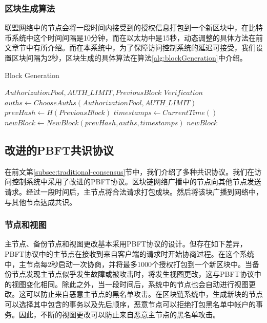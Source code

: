 \subsubsection{区块生成算法}

联盟网络中的节点会将一段时间内接受到的授权信息打包到一个新区块中，在比特币系统中这个时间间隔是10分钟，而在以太坊中是15秒，动态调整的具体方法在前文章节中有所介绍。而在本系统中，为了保障访问控制系统的延迟可接受，我们设置区块间隔为2秒，区块生成的具体算法在算法\ref{alg:blockGeneration}中介绍。

 \begin{algorithm}
 \caption{Block Generation}\label{alg:blockGeneration}
   \begin{algorithmic}[!htbp]
   \renewcommand{\algorithmicrequire}{\textbf{Input:}}
   \renewcommand{\algorithmicensure}{\textbf{Output:}}
   \REQUIRE $AuthorizationPool, AUTH\_LIMIT, PreviousBlock$
   \ENSURE  $Verification$
    \STATE $auths \gets ChooseAuths(AuthorizationPool, AUTH\_LIMIT)$
    \STATE $prevHash \gets H(PreviousBlock)$
    \STATE $timestamps \gets CurrentTime()$
    \STATE $newBlock \gets NewBlock(prevHash, auths, timestamps)$
   \RETURN $newBlock$
   \end{algorithmic}
 \end{algorithm}

\subsection{改进的PBFT共识协议}
\label{subsec:adapted-pbft}

在前文第\ref{subsec:traditional-consensus}节中，我们介绍了多种共识协议。我们在访问控制系统中采用了改进的PBFT协议。区块链网络广播中的节点向其他节点发送请求。经过一段时间后，主节点将合法请求打包成块。然后将该块广播到网络中，与其他节点达成共识。

\subsubsection{节点和视图}

主节点、备份节点和视图更改基本采用PBFT协议的设计。但存在如下差异，PBFT协议中的主节点在接收到来自客户端的请求时开始协商过程。在这个系统中，主节点每2秒启动一次协商，并将最多1000个授权打包到一个新区块中。当备份节点发现主节点似乎发生故障或被攻击时，将发生视图更改，这与PBFT协议中的视图变化相同。除此之外，当一段时间后，系统中的节点也会自动进行视图更改。这可以防止来自恶意主节点的黑名单攻击。在区块链系统中，生成新块的节点可以选择其中包含的事务以及先后顺序，恶意节点可以拒绝打包黑名单中帐户的事务。因此，不断的视图更改可以防止来自恶意主节点的黑名单攻击。

